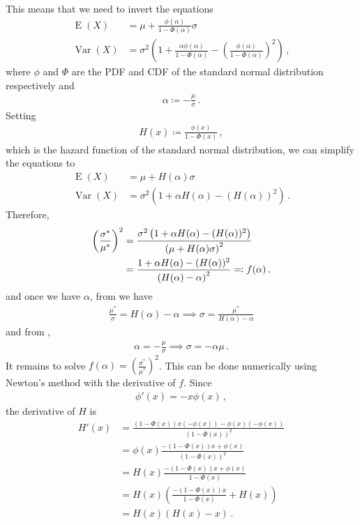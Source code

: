 \documentclass{article}
\DeclareMathOperator{\E}{E}
\DeclareMathOperator{\Var}{Var}
\begin{document}
%
This means that we need to invert the equations
%
\begin{align*}
	\E(X) &= \mu + \frac{\phi(\alpha)}{1 - \Phi(\alpha)} \sigma \\
	\Var(X) &= \sigma ^ 2
		\left(1 + \frac{\alpha \phi(\alpha)}{1 - \Phi(\alpha)}
		- \left(\frac{\phi(\alpha)}{1 - \Phi(\alpha)}\right) ^ 2\right) \,,
\end{align*}
%
where $\phi$ and $\Phi$ are the PDF and CDF of the
standard normal distribution respectively and
%
\begin{align}
	\alpha \coloneqq -\frac{\mu}{\sigma} \,.
	\label{tn-alpha}
\end{align}
%
Setting
%
\begin{align*}
	H(x) \coloneqq \frac{\phi(x)}{1 - \Phi(x)} \,,
\end{align*}
%
which is the hazard function of the standard normal distribution, we can
simplify the equations to
%
\begin{align}
	\E(X) &= \mu + H(\alpha)\sigma \label{tn-mean} \\
	\Var(X) &= \sigma ^ 2 \left(1 + \alpha H(\alpha)
		- (H(\alpha)) ^ 2 \right)
		\label{tn-var} \,.
\end{align}
%
Therefore,
%
\begin{align*}
	\left(\frac{\sigma^*}{\mu^*}\right)^2 &=
		\frac{\sigma ^ 2 \left(1 + \alpha H(\alpha)
		- (H(\alpha)) ^ 2 \right)}{%
		\left(\mu + H(\alpha) \sigma\right) ^ 2} \\
	&= \frac{1 + \alpha H(\alpha) - (H(\alpha)) ^ 2}
		{\left(H(\alpha) - \alpha\right) ^ 2} \eqqcolon f(\alpha) \,, \\
\end{align*}
%
and once we have $\alpha$, from  we have
%
\begin{align*}
	\frac{\mu^*}{\sigma} = H(\alpha) - \alpha
		\implies \sigma = \frac{\mu^*}{H(\alpha) - \alpha}
\end{align*}
%
and from ,
%
\begin{align*}
	\alpha = -\frac{\mu}{\sigma} \implies \sigma =  -\alpha \mu \,.
\end{align*}
%
It remains to solve $f(\alpha) = \left(\frac{\sigma^*}{\mu^*}\right) ^ 2$.
This can be done numerically using
Newton's method with the derivative of $f$.
Since
%
\begin{align*}
	\phi'(x) = -x \phi(x) \,,
\end{align*}
%
the derivative of $H$ is
%
\begin{align*}
	H'(x) &= \frac{(1 - \Phi(x)) x (-\phi(x))
		- \phi(x)(- \phi(x))}{(1 - \Phi(x))^2} \\
	&= \phi(x) \frac{-(1 - \Phi(x)) x + \phi(x)}
		{(1 - \Phi(x))^2} \\
	&= H(x) \frac{-(1 - \Phi(x)) x + \phi(x)}
		{1 - \Phi(x)} \\
	&= H(x) \left(\frac{-(1 - \Phi(x)) x}
		{1 - \Phi(x)} + H(x) \right) \\
	&= H(x) \left(H(x) - x \right) \,.
\end{align*}
\end{document}
